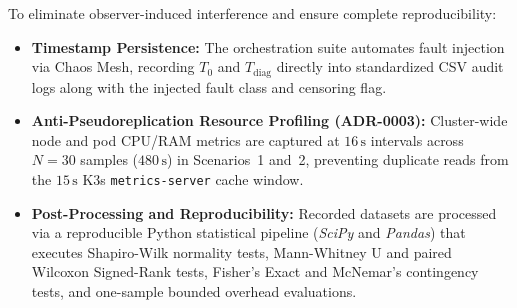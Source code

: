 To eliminate observer-induced interference and ensure complete reproducibility:
\begin{itemize}
    \item \textbf{Timestamp Persistence:} The orchestration suite automates fault injection via Chaos Mesh, recording $T_0$ and $T_{\text{diag}}$ directly into standardized CSV audit logs along with the injected fault class and censoring flag.
    \item \textbf{Anti-Pseudoreplication Resource Profiling (ADR-0003):} Cluster-wide node and pod CPU/RAM metrics are captured at $16\,\text{s}$ intervals across $N=30$ samples ($480\,\text{s}$) in Scenarios~1 and~2, preventing duplicate reads from the $15\,\text{s}$ K3s \texttt{metrics-server} cache window.
    \item \textbf{Post-Processing and Reproducibility:} Recorded datasets are processed via a reproducible Python statistical pipeline (\textit{SciPy} and \textit{Pandas}) that executes Shapiro-Wilk normality tests, Mann-Whitney U and paired Wilcoxon Signed-Rank tests, Fisher's Exact and McNemar's contingency tests, and one-sample bounded overhead evaluations.
\end{itemize}
